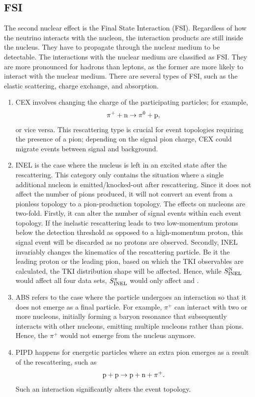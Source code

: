   \subsection{FSI}
  \label{sec:nuint-fsi}
  The second nuclear effect is the Final State Interaction (FSI).
  Regardless of how the neutrino interacts with the nucleon, the interaction products are still inside the nucleus.
  They have to propagate through the nuclear medium to be detectable.
  The interactions with the nuclear medium are classified as FSI.
  They are more pronounced for hadrons than leptons, as the former are more likely to interact with the nuclear medium.
  There are several types of FSI, such as the elastic scattering, charge exchange, and absorption.
  \begin{enumerate}
      \item 
  CEX involves changing the charge of the participating particles; for example,
  \begin{equation}
      \pi^+ + \textrm{n} \rightarrow \pi^0 + \textrm{p},
  \end{equation}
  or vice versa. This rescattering type is crucial for event topologies requiring the presence of a pion;  depending on the signal pion charge, CEX could migrate events between signal and background. 

  \item 
  INEL is the case where the nucleus is left in an excited state after the rescattering. This category only contains the situation where a single additional nucleon is emitted/knocked-out after rescattering. Since it does not affect the number of pions produced, it will not convert an event from a pionless topology to a pion-production topology. The effects on nucleons are two-fold. Firstly, it can alter the number of signal events within each event topology. If the inelastic rescattering leads to two low-momentum protons below the detection threshold as opposed to a high-momentum proton, this signal event will be discarded as no protons are observed. Secondly, INEL invariably changes the kinematics of the rescattering particle. Be it the leading proton or the leading pion, based on which the TKI observables are calculated, the TKI distribution shape will be affected. Hence, while $S_\textrm{INEL}^\textrm{N}$ would affect all four data sets, $S_\textrm{INEL}^{\pi}$ would only affect \ttkpip and \minpiz. 

  \item 
  ABS refers to the case where the particle undergoes an interaction so that it does not emerge as a final particle. For example, $\pi^+$ can interact with two or more nucleons, initially forming a baryon resonance that subsequently interacts with other nucleons, emitting multiple nucleons rather than pions. Hence, the $\pi^+$ would not emerge from the nucleus anymore.

  \item 
  PIPD happens for energetic particles where an extra pion emerges as a result of the rescattering, such as
  \begin{equation}
      \textrm{p} + \textrm{p} \rightarrow \textrm{p} + \textrm{n} + \pi^+.
  \end{equation}
  Such an interaction significantly alters the event topology. 

  \end{enumerate}


